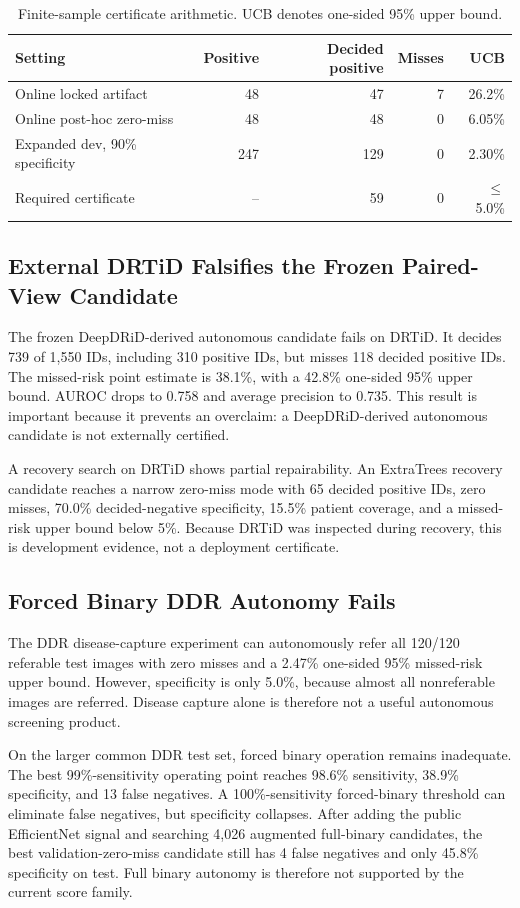 \documentclass[journal]{IEEEtran}
\begin{document}
\begin{table}[t]
\centering
\caption{Finite-sample certificate arithmetic. UCB denotes one-sided 95\% upper bound.}
\label{tab:certmath}
\begin{tabular}{lrrrr}
\toprule
Setting & Positive & Decided positive & Misses & UCB \\
\midrule
Online locked artifact & 48 & 47 & 7 & 26.2\% \\
Online post-hoc zero-miss & 48 & 48 & 0 & 6.05\% \\
Expanded dev, 90\% specificity & 247 & 129 & 0 & 2.30\% \\
Required certificate & -- & 59 & 0 & $\leq$5.0\% \\
\bottomrule
\end{tabular}
\end{table}

\subsection{External DRTiD Falsifies the Frozen Paired-View Candidate}
The frozen DeepDRiD-derived autonomous candidate fails on DRTiD. It decides 739 of 1,550 IDs, including 310 positive IDs, but misses 118 decided positive IDs. The missed-risk point estimate is 38.1\%, with a 42.8\% one-sided 95\% upper bound. AUROC drops to 0.758 and average precision to 0.735. This result is important because it prevents an overclaim: a DeepDRiD-derived autonomous candidate is not externally certified.

A recovery search on DRTiD shows partial repairability. An ExtraTrees recovery candidate reaches a narrow zero-miss mode with 65 decided positive IDs, zero misses, 70.0\% decided-negative specificity, 15.5\% patient coverage, and a missed-risk upper bound below 5\%. Because DRTiD was inspected during recovery, this is development evidence, not a deployment certificate.

\subsection{Forced Binary DDR Autonomy Fails}
The DDR disease-capture experiment can autonomously refer all 120/120 referable test images with zero misses and a 2.47\% one-sided 95\% missed-risk upper bound. However, specificity is only 5.0\%, because almost all nonreferable images are referred. Disease capture alone is therefore not a useful autonomous screening product.

On the larger common DDR test set, forced binary operation remains inadequate. The best 99\%-sensitivity operating point reaches 98.6\% sensitivity, 38.9\% specificity, and 13 false negatives. A 100\%-sensitivity forced-binary threshold can eliminate false negatives, but specificity collapses. After adding the public EfficientNet signal and searching 4,026 augmented full-binary candidates, the best validation-zero-miss candidate still has 4 false negatives and only 45.8\% specificity on test. Full binary autonomy is therefore not supported by the current score family.
\end{document}
